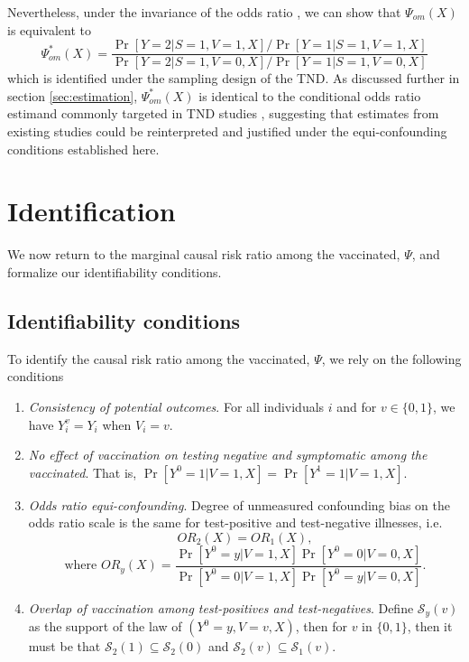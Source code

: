 \documentclass[11pt]{article}
\begin{document}
Nevertheless, under the invariance of the odds ratio \cite{breslow_regression_1976}, we can show that $\Psi_{om}(X)$ is equivalent to
\begin{equation}\label{eqn:or_estimand_tnd}
    \Psi^*_{om}(X) = \dfrac{\Pr[Y = 2 | S = 1, V = 1, X]/\Pr[Y = 1 | S = 1, V = 1, X]}{\Pr[Y = 2 | S = 1, V = 0, X]/\Pr[Y = 1 | S = 1, V = 0, X]}
\end{equation}  
which is identified under the sampling design of the TND. As discussed further in section \ref{sec:estimation}, $\Psi^*_{om}(X)$ is identical to the conditional odds ratio estimand commonly targeted in TND studies \cite{jackson_test-negative_2013}, suggesting that estimates from existing studies could be reinterpreted and justified under the equi-confounding conditions established here.

\section*{Identification} \label{sec:identification}
We now return to the marginal causal risk ratio among the vaccinated, $\Psi$, and formalize our identifiability conditions.

\subsection*{Identifiability conditions} \label{sec:conditions}
    To identify the causal risk ratio among the vaccinated, $\Psi$, we rely on the following conditions
\begin{enumerate}[label=\upshape(A\arabic*), ref=A\arabic*]
    \item\label{ass1} \textit{Consistency of potential outcomes}. For all individuals $i$ and for $v \in \{0, 1\}$, we have $Y_i^v = Y_i$ when $V_i = v$. 
    \item\label{ass2} \textit{No effect of vaccination on testing negative and symptomatic among the vaccinated}. That is, $\Pr[Y^0=1 | V = 1, X] = \Pr[Y^1=1 | V = 1, X].$
    \item\label{ass3} \textit{Odds ratio equi-confounding}. Degree of unmeasured confounding bias on the odds ratio scale is the same for test-positive and test-negative illnesses, i.e. 
    $$OR_2(X) = OR_1(X), $$
    $$ \text{where } OR_y(X) = \frac{\Pr[Y^0 = y | V = 1, X]\Pr[Y^0 = 0 | V = 0, X]}{\Pr[Y^0 = 0 | V = 1, X]\Pr[Y^0 = y | V = 0, X]}.$$
    \item\label{ass4} \textit{Overlap of vaccination among test-positives and test-negatives}. Define $\mathcal{S}_y(v)$ as the support of the law of $(Y^0 = y, V = v, X)$, then for $v$ in $\{0,1\}$, then it must be that $\mathcal{S}_2(1) \subseteq \mathcal{S}_2(0)$ and $\mathcal{S}_2(v) \subseteq \mathcal{S}_1(v).$
\end{enumerate}
\end{document}
